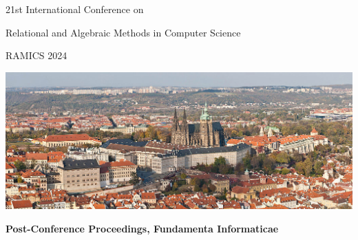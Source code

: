 \documentclass[a4paper, 11pt]{article}
\begin{document}
\begin{center}
  {\Large 21st International Conference on}

  \medskip

  {\Large Relational and Algebraic Methods in Computer Science}

  \bigskip

  {\fontsize{36}{50}\selectfont RAMICS 2024}

  \bigskip

  \includegraphics[width=.65\linewidth, trim=0 20 0 0, clip]{prague}

  \bigskip

  {\Large\bf Post-Conference Proceedings, Fundamenta Informaticae}
\end{center}
\end{document}
